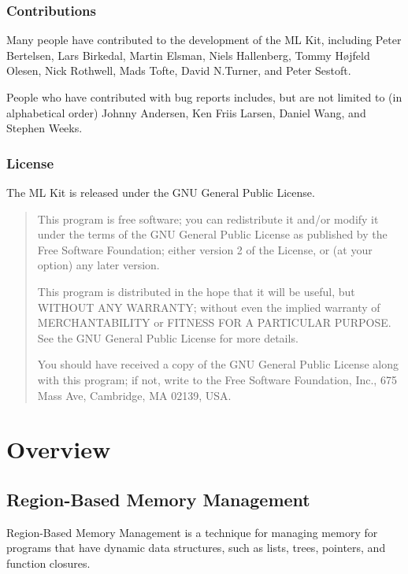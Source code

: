 \documentclass[12pt]{book}
\begin{document}
\newpage

\section*{Contributions}
Many people have contributed to the development of the ML Kit,
including Peter Bertelsen, Lars Birkedal, Martin Elsman, Niels
Hallenberg, Tommy H\o jfeld Olesen, Nick Rothwell, Mads Tofte, David
N.\@ Turner, and Peter Sestoft.

People who have contributed with bug reports includes, but are not
limited to (in alphabetical order) Johnny Andersen, Ken Friis Larsen,
Daniel Wang, and Stephen Weeks.

\section*{License}
The ML Kit is released under the GNU General Public License.  

{\sc
\begin{quote}
  This program is free software; you can redistribute it and/or
  modify it under the terms of the GNU General Public License as
  published by the Free Software Foundation; either version 2 of the
  License, or (at your option) any later version.
  
  This program is distributed in the hope that it will be useful, but
  WITHOUT ANY WARRANTY; without even the implied warranty of
  MERCHANTABILITY or FITNESS FOR A PARTICULAR PURPOSE.  See the GNU
  General Public License for more details.
  
  You should have received a copy of the GNU General Public License
  along with this program; if not, write to the Free Software
  Foundation, Inc., 675 Mass Ave, Cambridge, MA 02139, USA.
\end{quote}
}

\part{Overview}

\chapter{Region-Based Memory Management}
\label{intro.sec}
Region-Based Memory Management is a technique for managing
memory for programs that have dynamic data structures, such as lists,
trees, pointers, and function closures.
\end{document}

